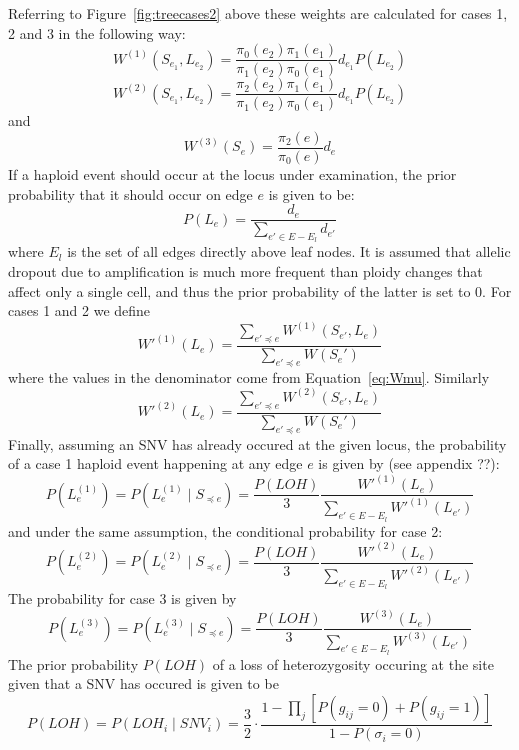 \documentclass[../../main.tex]{subfiles}
\begin{document}
Referring to Figure~\ref{fig:treecases2} above these weights are calculated for cases 1, 2 and 3 in the following way:
\begin{equation*}
W^{(1)}(S_{e_1},L_{e_2}) = \frac{\pi_0(e_2)\pi_1(e_1)}{\pi_1(e_2)\pi_0(e_1)}d_{e_1}P(L_{e_2})
\end{equation*}
\begin{equation*}
W^{(2)}(S_{e_1},L_{e_2}) = \frac{\pi_2(e_2)\pi_1(e_1)}{\pi_1(e_2)\pi_0(e_1)}d_{e_1}P(L_{e_2})
\end{equation*}
and
\begin{equation*}
W^{(3)}(S_e) = \frac{\pi_2(e)}{\pi_0(e)}d_e
\end{equation*} 
If a haploid event should occur at the locus under examination, the prior probability that it should occur on edge $e$ is given to be: %
\begin{equation*}
P(L_e) = \frac{d_e}{\sum_{e'\in E-E_l} d_{e'}}
\end{equation*}
where $E_l$ is the set of all edges directly above leaf nodes. It is assumed that allelic dropout due to amplification is much more frequent than ploidy changes that affect only a single cell, and thus the prior probability of the latter is set to 0. For cases 1 and 2 we define
\begin{equation*}
W'^{(1)}(L_e) = \frac{\sum_{e' \preceq e} W^{(1)}(S_{e'},L_e)}{\sum_{e' \preceq e}W(S_e')} 
\end{equation*}
where the values in the denominator come from Equation~\eqref{eq:Wmu}. Similarly
\begin{equation*}
W'^{(2)}(L_e) = \frac{\sum_{e' \preceq e} W^{(2)}(S_{e'},L_e)}{\sum_{e' \preceq e}W(S_e')} 
\end{equation*}
Finally, assuming an SNV has already occured at the given locus, the probability of a case 1 haploid event happening at any edge $e$ is given by (see appendix ??):
\begin{equation*}
P(L_e^{(1)}) = P(L_e^{(1)}\mid S_{\preceq e}) = \frac{P(LOH)}{3} \frac{W'^{(1)}(L_e)}{\sum_{e'\in E-E_l}W'^{(1)}(L_{e'})}
\end{equation*}
and under the same assumption, the conditional probability for case 2:
\begin{equation*}
P(L_e^{(2)}) = P(L_e^{(2)}\mid S_{\preceq e}) = \frac{P(LOH)}{3} \frac{W'^{(2)}(L_e)}{\sum_{e'\in E-E_l}W'^{(2)}(L_{e'})}
\end{equation*}
The probability for case 3 is given by
\begin{equation*}
P(L_e^{(3)}) = P(L_e^{(3)}\mid S_{\preceq e}) = \frac{P(LOH)}{3} \frac{W^{(3)}(L_e)}{\sum_{e'\in E-E_l}W^{(3)}(L_{e'})}
\end{equation*}
The prior probability $P(LOH)$ of a loss of heterozygosity occuring at the site given that a SNV has occured is given to be
\begin{equation*}
P(LOH) = P(LOH_i \mid SNV_i) = \frac{3}{2}\cdot\frac{1-\prod_j\left[P(g_{ij}=0)+P(g_{ij}=1)\right]}{1-P(\sigma_i = 0)}
\end{equation*}
\end{document}
